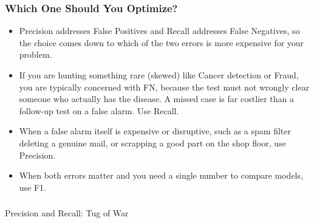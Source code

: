 \begin{frame}[fragile]\frametitle{Which One Should You Optimize?}
\begin{itemize}
\item Precision addresses False Positives and Recall addresses False Negatives, so the choice comes down to which of the two errors is more expensive for your problem.
\item If you are hunting something rare (skewed) like Cancer detection or Fraud, you are typically concerned with FN, because the test must not wrongly clear someone who actually has the disease. A missed case is far costlier than a follow-up test on a false alarm. Use Recall.
\item When a false alarm itself is expensive or disruptive, such as a spam filter deleting a genuine mail, or scrapping a good part on the shop floor, use Precision.
\item When both errors matter and you need a single number to compare models, use F1.
\end{itemize}
\end{frame}






\begin{frame}[fragile]\frametitle{}
\begin{center}
{\Large Precision and Recall: Tug of War}
\end{center}
\end{frame}


